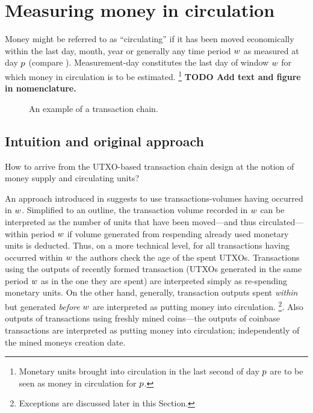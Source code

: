 \section{Measuring money in circulation}
\label{sec:measure}%

Money might be referred to as ``circulating'' if it has been moved economically within the last day, month, year or generally any time period ${w}$ as measured at day \({p}\) (compare \citep{pernice2019cryptocurrencies}). %
Measurement-day constitutes the last day of window \({w}\) for which money in circulation is to be estimated.%
\footnote{Monetary units brought into circulation in the last second of day \({p}\) are to be seen as money in circulation for \({p}\). }%
\textbf{TODO Add text and figure in nomenclature.}

\begin{figure}[ht!]%
	\centering
	\ifdefined\varInputFigs%
	
	\else%
	\fi%
	\caption{%
		An example of a transaction chain. %
	}%
	\label{fig:mcirc_concept}%
\end{figure}%


\subsection{Intuition and original approach}
\label{sec:orig_approach}%

How to arrive from the UTXO-based transaction chain design at the notion of money supply and circulating units? %

An approach introduced in \cite{pernice2019cryptocurrencies} suggests to use transactions-volumes having occurred in ${w}$. %
Simplified to an outline, the transaction volume recorded in \({w}\) can be interpreted as the number of units that have been moved---and thus circulated---within period \({w}\) if volume generated from respending already used monetary units is deducted. %
Thus, on a more technical level, for all transactions having occurred within \({w}\) the authors check the age of the spent UTXOs. %
Transactions using the outputs of recently formed transaction (UTXOs generated in the same period \({w}\) as in the one they are spent) are interpreted simply as re-spending monetary units. %
On the other hand, generally, transaction outputs spent \emph{within} but generated \emph{before} \({w}\) are interpreted as putting money into circulation.%
\footnote{Exceptions are discussed later in this Section.}. %
Also outputs of transactions using freshly mined coins---the outputs of coinbase transactions are interpreted as putting money into circulation; independently of the mined moneys creation date. %

